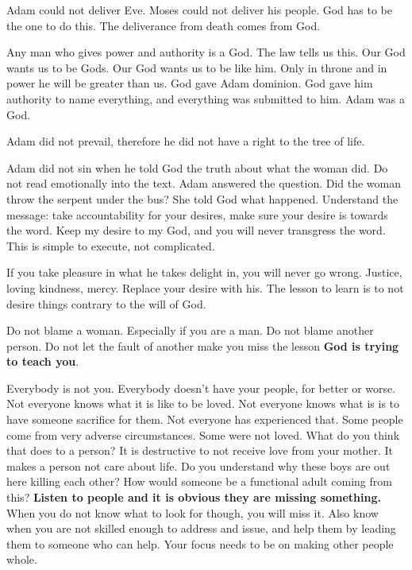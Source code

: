 \documentclass[12pt]{article}
\begin{document}
	Adam could not deliver Eve. Moses could not deliver his people.
	God has to be the one to do this. The deliverance from death
	comes from God.

	Any man who gives power and authority is a God. The law
	tells us this. Our God wants us to be Gods. Our God wants
	us to be like him. Only in throne and in power he will be
	greater than us. God gave Adam dominion. God gave him authority
	to name everything, and everything was submitted to him.
	Adam was a God.

	Adam did not prevail, therefore he did not have a right to
	the tree of life.

	Adam did not sin when he told God the truth about what the
	woman did. Do not read emotionally into the text. Adam answered
	the question. Did the woman throw the serpent under the bus?
	She told God what happened. Understand the message: take
	accountability for your desires, make sure your desire is
	towards the word. Keep my desire to my God, and you will never
	transgress the word. This is simple to execute, not complicated.
	
	If you take pleasure in what he takes delight in, you will
	never go wrong. Justice, loving kindness, mercy. Replace your
	desire with his. The lesson to learn is to not desire things
	contrary to the will of God.

	Do not blame a woman. Especially if you are a man. Do not
	blame another person. Do not let the fault of another make
	you miss the lesson \textbf{God is trying to teach you}.

	Everybody is not you. Everybody doesn't have your people, for
	better or worse. Not everyone knows what it is like to be loved.
	Not everyone knows what is is to have someone sacrifice for them.
	Not everyone has experienced that. Some people come from very
	adverse circumstances. Some were not loved. What do you think that
	does to a person? It is destructive to not receive love from
	your mother. It makes a person not care about life. Do you
	understand why these boys are out here killing each other? How
	would someone be a functional adult coming from this? \textbf{
	Listen to people and it is obvious they are missing something.}
	When you do not know what to look for though, you will miss it.
	Also know when you are not skilled enough to address and issue,
	and help them by leading them to someone who can help. Your focus
	needs to be on making other people whole.

	\begin{quote}
		\BibleRomansFifteenOne{}
	\end{quote}
\end{document}
